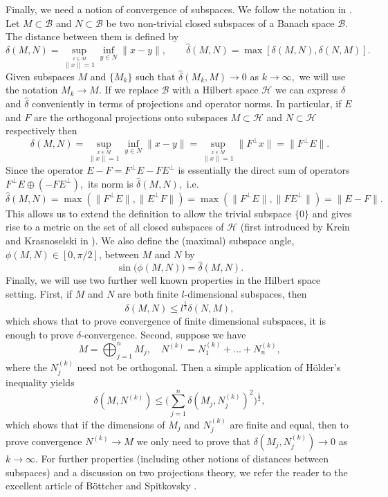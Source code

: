 \documentclass[a4paper,10pt]{article}
\begin{document}
Finally, we need a notion of convergence of subspaces. We follow the notation in \cite{kato2013perturbation}. Let $M \subset \mathcal{B}$ and $N \subset \mathcal{B}$ be two non-trivial closed subspaces of a Banach space $\mathcal{B}.$ The distance between them is defined by 
\[
\delta(M,N) = \sup_{\stackrel{x \in M}{\|x\| = 1}}\inf_{y \in N} \|x -y\|, \qquad \hat \delta(M,N) = \max[\delta(M,N),\delta(N,M)].
\]
Given subspaces $M$ and $\{M_k\}$ such that $\hat \delta(M_k,M)
\rightarrow 0$ as $k \rightarrow \infty,$ we will use the notation $M_k {\rightarrow} M$. If we replace $\mathcal{B}$ with a Hilbert space $\mathcal{H}$ we can express $\delta$ and $\hat \delta$ conveniently in terms of projections and operator norms. In particular, if $E$ and $F$ are the orthogonal projections onto subspaces $M \subset \mathcal{H}$ and $N \subset \mathcal{H}$ respectively then
\[
\delta(M,N) = \sup_{\stackrel{x \in M}{\|x\| = 1}}\inf_{y \in N}
\|x -y\| = \sup_{\stackrel{x \in M}{\|x\| = 1}}
\|F^{\perp}x\| = \|F^{\perp}E\|.
\]  
Since the operator $E-F = F^{\perp}E - FE^{\perp}$ is essentially the
direct sum of operators $F^{\perp}E \oplus (- FE^{\perp}),$ its norm
is $\hat \delta(M,N),$ i.e.
\begin{equation}\label{cam}
\hat \delta(M,N) = \max(\|F^{\perp}E\|, \|E^{\perp}F\|) 
= \max(\|F^{\perp}E\|, \|FE^{\perp}\|) = \|E-F\|.
\end{equation}
This allows us to extend the definition to allow the trivial subspace $\{0\}$ and gives rise to a metric on the set of all closed subspaces of $\mathcal{H}$ (first introduced by Krein and Krasnoselski in \cite{krein1947fundamental}). We also define the (maximal) subspace angle, $\phi(M,N)\in[0,\pi/2]$, between $M$ and $N$ by
\begin{equation}
\label{subspace_angle}
\sin\big(\phi(M,N)\big)=\hat \delta(M,N). 
\end{equation}
Finally, we will use two further well known properties in the Hilbert space setting. First, if $M$ and $N$ are both finite $l$-dimensional subspaces, then
\begin{equation}
\label{fd_property}
\delta(M,N)\leq l^{\frac{1}{2}}\delta(N,M),
\end{equation}
which shows that to prove convergence of finite dimensional subspaces, it is enough to prove $\delta$-convergence. Second, suppose we have
$$
M=\bigoplus_{j=1}^n M_j,\quad N^{(k)}=N_1^{(k)}+...+N_n^{(k)},
$$
where the $N_j^{(k)}$ need not be orthogonal. Then a simple application of H\"older's inequality yields
\begin{equation}
\label{sum_property}
\delta(M,N^{(k)})\leq \Big(\sum_{j=1}^n\delta(M_j,N_j^{(k)})^2\Big)^{\frac{1}{2}},
\end{equation}
which shows that if the dimensions of $M_j$ and $N_j^{(k)}$ are finite and equal, then to prove convergence $N^{(k)}\rightarrow M$ we only need to prove that $\delta(M_j,N_j^{(k)})\rightarrow0$ as $k\rightarrow\infty$. For further properties (including other notions of distances between subspaces) and a discussion on two projections theory, we refer the reader to the excellent article of B{\"o}ttcher and Spitkovsky \cite{bottcher2010gentle}.
\end{document}
